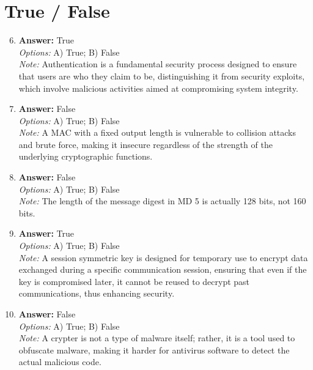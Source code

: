 \documentclass[12pt]{article}
\begin{document}
\section*{True / False}
\begin{enumerate}[label=\arabic*.]
\setcounter{enumi}{5}
\item \textbf{Answer:} True
\\ \textit{Options:} A) True; B) False
\\ \textit{Note:} Authentication is a fundamental security process designed to ensure that users are who they claim to be, distinguishing it from security exploits, which involve malicious activities aimed at compromising system integrity.
\item \textbf{Answer:} False
\\ \textit{Options:} A) True; B) False
\\ \textit{Note:} A MAC with a fixed output length is vulnerable to collision attacks and brute force, making it insecure regardless of the strength of the underlying cryptographic functions.
\item \textbf{Answer:} False
\\ \textit{Options:} A) True; B) False
\\ \textit{Note:} The length of the message digest in MD 5 is actually 128 bits, not 160 bits.
\item \textbf{Answer:} True
\\ \textit{Options:} A) True; B) False
\\ \textit{Note:} A session symmetric key is designed for temporary use to encrypt data exchanged during a specific communication session, ensuring that even if the key is compromised later, it cannot be reused to decrypt past communications, thus enhancing security.
\item \textbf{Answer:} False
\\ \textit{Options:} A) True; B) False
\\ \textit{Note:} A crypter is not a type of malware itself; rather, it is a tool used to obfuscate malware, making it harder for antivirus software to detect the actual malicious code.
\end{enumerate}
\end{document}
